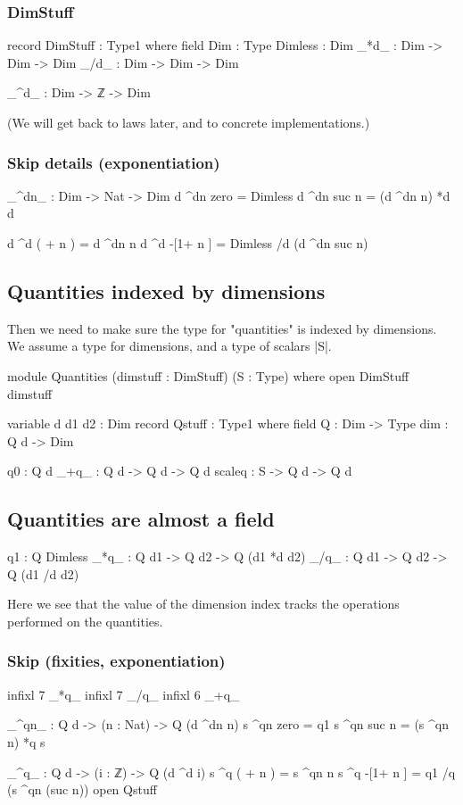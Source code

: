 \documentclass{article}
\begin{document}
\subsubsection{DimStuff}
\label{sec:orgb0d530a}
\begin{code}
record DimStuff : Type1 where
  field
    Dim : Type
    Dimless : Dim
    _*d_  : Dim -> Dim -> Dim
    _/d_  : Dim -> Dim -> Dim

  _^d_ : Dim -> ℤ -> Dim
\end{code}
(We will get back to laws later, and to concrete implementations.)
\subsubsection{Skip details (exponentiation)}
\label{sec:org8b0821f}
\begin{code}
  _^dn_ : Dim -> Nat -> Dim
  d ^dn zero   = Dimless
  d ^dn suc n  = (d ^dn n) *d d

  d ^d  ( + n )  = d ^dn n
  d ^d -[1+ n ]  = Dimless /d (d ^dn suc n)
\end{code}
\subsection{Quantities indexed by dimensions}
\label{sec:org0cd7662}
Then we need to make sure the type for "quantities" is indexed by
dimensions. We assume a type for dimensions, and a type of
scalars |S|.
\begin{code}
module Quantities (dimstuff : DimStuff) (S : Type) where
  open DimStuff dimstuff

  variable d d1 d2 : Dim
  record Qstuff : Type1 where
    field
      Q     : Dim -> Type
      dim   : Q d -> Dim

      q0      : Q d
      _+q_    : Q d  -> Q d  -> Q d
      scaleq  : S    -> Q d  -> Q d
\end{code}
\subsection{Quantities are almost a field}
\label{sec:org0c728a2}
\begin{code}
      q1    : Q Dimless
      _*q_  : Q d1 -> Q d2 -> Q (d1 *d d2)
      _/q_  : Q d1 -> Q d2 -> Q (d1 /d d2)
\end{code}

Here we see that the value of the dimension index tracks the
operations performed on the quantities.

\subsubsection{Skip (fixities, exponentiation)}
\label{sec:orgd136fdd}
\begin{code}
    infixl 7 _*q_
    infixl 7 _/q_
    infixl 6 _+q_

    _^qn_ : Q d -> (n : Nat) -> Q (d ^dn n)
    s ^qn zero   = q1
    s ^qn suc n  = (s ^qn n) *q s

    _^q_ : Q d -> (i : ℤ) -> Q (d ^d i)
    s ^q  ( + n )  = s ^qn n
    s ^q -[1+ n ]  = q1 /q (s ^qn (suc n))
  open Qstuff
\end{code}
\end{document}

